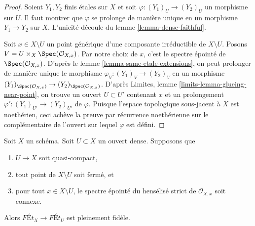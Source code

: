 \begin{proof}
Soient $Y_1, Y_2$ finis étales sur $X$ et soit
$\varphi : (Y_1)_U \to (Y_2)_U$ un morphisme sur $U$. Il faut montrer que
$\varphi$ se prolonge de manière unique en un morphisme $Y_1 \to Y_2$ sur $X$.
L'unicité découle du lemme \ref{lemma-dense-faithful}.

\medskip\noindent
Soit $x \in X \setminus U$ un point générique d'une composante irréductible
de $X \setminus U$. Posons $V = U \times_X \Spec(\mathcal{O}_{X, x})$.
Par notre choix de $x$, c'est le spectre épointé de
$\Spec(\mathcal{O}_{X, x})$. D'après le
lemme \ref{lemma-same-etale-extensions},
on peut prolonger de manière unique le morphisme $\varphi_V : (Y_1)_V \to (Y_2)_V$
en un morphisme
$(Y_1)_{\Spec(\mathcal{O}_{X, x})} \to (Y_2)_{\Spec(\mathcal{O}_{X, x})}$.
D'après Limites, lemme \ref{limits-lemma-glueing-near-point},
on trouve un ouvert $U \subset U'$ contenant $x$ et un prolongement
$\varphi' : (Y_1)_{U'} \to (Y_2)_{U'}$ de $\varphi$.
Puisque l'espace topologique sous-jacent à $X$ est noethérien,
ceci achève la preuve par récurrence noethérienne sur le complémentaire
de l'ouvert sur lequel $\varphi$ est défini.
\end{proof}

\begin{lemma}
\label{lemma-retrocompact-dense-open-connected-at-infinity-closed}
Soit $X$ un schéma. Soit $U \subset X$ un ouvert dense. Supposons que
\begin{enumerate}
\item $U \to X$ soit quasi-compact,
\item tout point de $X \setminus U$ soit fermé, et
\item pour tout $x \in X \setminus U$, le spectre épointé du
hensélisé strict de $\mathcal{O}_{X, x}$ soit connexe.
\end{enumerate}
Alors $\textit{F\'Et}_X \to \textit{F\'Et}_U$ est pleinement fidèle.
\end{lemma}

